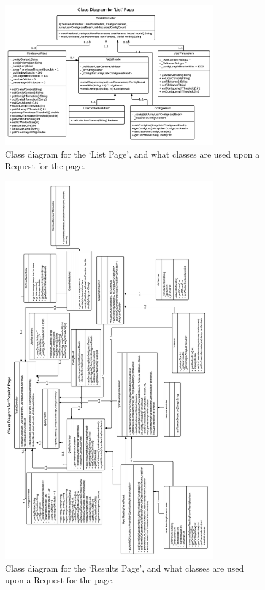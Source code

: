 \begin{figure}[H]
\centering
\includegraphics[width=0.8\textwidth]{images/umllistpage}
\caption{Class diagram for the `List Page', and what classes are used upon a Request for the page.}
\end{figure}

\begin{figure}[H]
\centering
\includegraphics[width=0.8\textwidth]{images/umlresultspageflip}
\caption{Class diagram for the `Results Page', and what classes are used upon a Request for the page.}
\end{figure}

